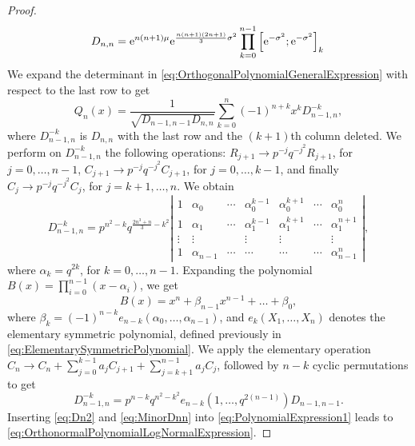 \begin{subappendices}
\begin{proof}
\begin{equation}\label{eq:Dn2}
D_{n,n}=\mathrm{e}^{n(n+1)\mu}\mathrm{e}^{\frac{n(n+1)(2n+1)}{3}\sigma^{2}}\prod_{k=0}^{n-1}
\left[\mathrm{e}^{-\sigma^{2}};\mathrm{e}^{-\sigma^{2}}\right]_{k}\\
\end{equation}
We expand the determinant in \eqref{eq:OrthogonalPolynomialGeneralExpression} with respect to the last row to get
\begin{equation}\label{eq:PolynomialExpression1}
Q_{n}(x)=\frac{1}{\sqrt{D_{n-1,n-1}D_{n,n}}}\sum_{k=0}^{n}(-1)^{n+k}x^{k}D_{n-1,n}^{-k},
\end{equation}
where $D_{n-1,n}^{-k}$ is $D_{n,n}$ with the last row and the $(k+1)$th column deleted. We perform on  $D_{n-1,n}^{-k}$ the following operations: $R_{j+1}\rightarrow p^{-j}q^{-j^{2}}R_{j+1}$, for $j=0,\ldots,n-1$, $C_{j+1}\rightarrow p^{-j}q^{-j^{2}}C_{j+1}$, for $j=0,\ldots,k-1$, and finally $C_{j}\rightarrow p^{-j}q^{-j^{2}}C_{j}$, for $j=k+1,\ldots,n$. We obtain
\begin{equation*}
D_{n-1,n}^{-k}=p^{n^{2}-k}q^{\frac{2n^{3}+n}{3}-k^{2}}\left| \begin{array}{ccccccc}
1&\alpha_{0}&\cdots&\alpha_{0}^{k-1}&\alpha_{0}^{k+1}&\cdots&\alpha_{0}^{n} \\
1&\alpha_{1}&\cdots&\alpha_{1}^{k-1}&\alpha_{1}^{k+1}&\cdots&\alpha_{1}^{n+1}  \\
\vdots&\vdots&&\vdots&\vdots&&\vdots\\
1&\alpha_{n-1}&\cdots&\cdots&\cdots&\cdots&\alpha_{n-1}^{n}
\end{array}
\right|,
\end{equation*}
where $\alpha_{k}=q^{2k}$, for $k=0,\ldots,n-1$. Expanding the polynomial $B(x)=\prod_{i=0}^{n-1}(x-\alpha_{i})$, we get
\begin{equation*}
B(x)=x^{n}+\beta_{n-1}x^{n-1}+\ldots+\beta_{0},
\end{equation*}
where $\beta_{k}=(-1)^{n-k}e_{n-k}\left(\alpha_{0},\ldots,\alpha_{n-1}\right)$, and $e_{k}\left(X_{1},\ldots,X_{n}\right)$ denotes the elementary symmetric polynomial, defined previously in  \eqref{eq:ElementarySymmetricPolynomial}. We apply the elementary operation $C_{n}\rightarrow C_{n}+\sum_{j=0}^{k-1}a_{j}C_{j+1}+\sum_{j=k+1}^{n-1}a_{j}C_{j}$, followed by $n-k$ cyclic permutations to get
\begin{equation}\label{eq:MinorDnn}
D_{n-1,n}^{-k}=p^{n-k}q^{n^{2}-k^{2}}e_{n-k}\left(1,\ldots,q^{2(n-1)}\right)D_{n-1,n-1}.
\end{equation}
Inserting \eqref{eq:Dn2} and \eqref{eq:MinorDnn} into \eqref{eq:PolynomialExpression1} leads to \eqref{eq:OrthonormalPolynomialLogNormalExpression}.
\end{proof}


\end{subappendices}
